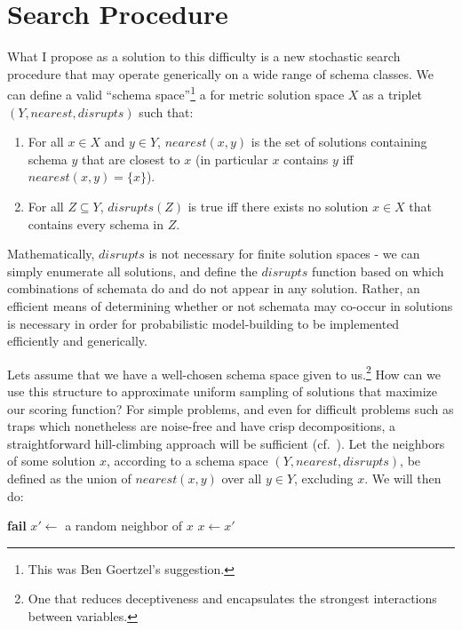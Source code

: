 \documentclass[letterpaper]{article}
\begin{document}
\section{Search Procedure}

What I propose as a solution to this difficulty is a new stochastic search
procedure that may operate generically on a wide range of schema classes. We
can define a valid ``schema space''\footnote{This was Ben Goertzel's
suggestion.} a for metric solution space $X$ as a triplet
$(Y,nearest,disrupts)$ such that:

\begin{enumerate}
\item For all $x \in X$ and $y \in Y$, $nearest(x,y)$ is the set of solutions
  containing schema $y$ that are closest to $x$ (in particular $x$ contains $y$
  iff $nearest(x,y)=\{x\}$).
\item For all $Z \subseteq Y$, $disrupts(Z)$ is true iff there exists no
  solution $x \in X$ that contains every schema in $Z$.
\end{enumerate}

Mathematically, $disrupts$ is not necessary for finite solution spaces - we can
simply enumerate all solutions, and define the $disrupts$ function based on
which combinations of schemata do and do not appear in any solution. Rather, an
efficient means of determining whether or not schemata may co-occur in
solutions is necessary in order for probabilistic model-building to be
implemented efficiently and generically.

Lets assume that we have a well-chosen schema space given to us.\footnote{One
  that reduces deceptiveness and encapsulates the strongest interactions
  between variables.} How can we use this structure to approximate uniform
sampling of solutions that maximize our scoring function?  For simple problems,
and even for difficult problems such as traps which nonetheless are noise-free
and have crisp decompositions, a straightforward hill-climbing approach will be
sufficient (cf.~\cite{Iclanzan}). Let the neighbors of some solution $x$,
according to a schema space $(Y,nearest,disrupts)$, be defined as the union of
$nearest(x,y)$ over all $y \in Y$, excluding $x$. We will then do:

\begin{algorithmic}
      \State \textbf{fail}
    \EndIf
    \State $x' \leftarrow$ a random neighbor of $x$
      \State $x \leftarrow x'$
    \EndIf
  \EndWhile
\EndProcedure
\end{algorithmic}
\end{document}
